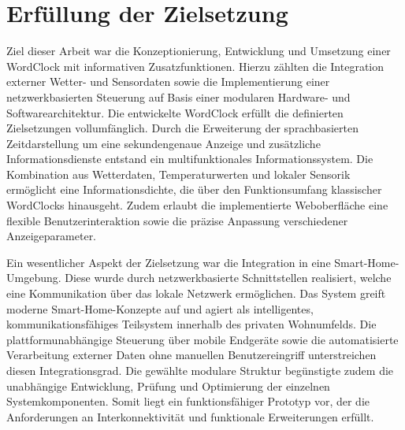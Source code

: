 \section{Erfüllung der Zielsetzung}
Ziel dieser Arbeit war die Konzeptionierung, Entwicklung und Umsetzung einer WordClock mit informativen Zusatzfunktionen.
Hierzu zählten die Integration externer Wetter- und Sensordaten sowie die Implementierung einer netzwerkbasierten Steuerung auf Basis einer modularen Hardware- und Softwarearchitektur.
Die entwickelte WordClock erfüllt die definierten Zielsetzungen vollumfänglich.
Durch die Erweiterung der sprachbasierten Zeitdarstellung um eine sekundengenaue Anzeige und zusätzliche Informationsdienste entstand ein multifunktionales Informationssystem.
Die Kombination aus Wetterdaten, Temperaturwerten und lokaler Sensorik ermöglicht eine Informationsdichte, die über den Funktionsumfang klassischer WordClocks hinausgeht.
Zudem erlaubt die implementierte Weboberfläche eine flexible Benutzerinteraktion sowie die präzise Anpassung verschiedener Anzeigeparameter.

Ein wesentlicher Aspekt der Zielsetzung war die Integration in eine Smart-Home-Umgebung.
Diese wurde durch netzwerkbasierte Schnittstellen realisiert, welche eine Kommunikation über das lokale Netzwerk ermöglichen.
Das System greift moderne Smart-Home-Konzepte auf und agiert als intelligentes, kommunikationsfähiges Teilsystem innerhalb des privaten Wohnumfelds.
Die plattformunabhängige Steuerung über mobile Endgeräte sowie die automatisierte Verarbeitung externer Daten ohne manuellen Benutzereingriff unterstreichen diesen Integrationsgrad.
Die gewählte modulare Struktur begünstigte zudem die unabhängige Entwicklung, Prüfung und Optimierung der einzelnen Systemkomponenten.
Somit liegt ein funktionsfähiger Prototyp vor, der die Anforderungen an Interkonnektivität und funktionale Erweiterungen erfüllt.
